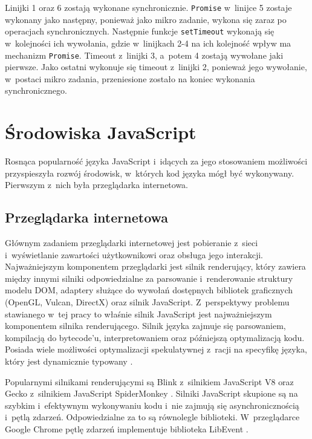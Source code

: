 Linijki 1 oraz 6 zostają wykonane synchronicznie. \lstinline{Promise} w~linijce 5 zostaje wykonany jako następny, ponieważ jako mikro zadanie, wykona się zaraz po operacjach synchronicznych. Następnie funkcje \lstinline{setTimeout} wykonają się w~kolejności ich wywołania, gdzie w~linijkach 2-4 na ich kolejność wpływ ma mechanizm \lstinline{Promise}. Timeout z~linijki 3, a~potem 4 zostają wywołane jaki pierwsze. Jako ostatni wykonuje się timeout z~linijki 2, ponieważ jego wywołanie, w~postaci mikro zadania, przeniesione zostało na koniec wykonania synchronicznego.

\section{Środowiska JavaScript}
\label{sec:env-modules}

Rosnąca popularność języka JavaScript i~idących za jego stosowaniem możliwości przyspieszyła rozwój środowisk, w~których kod języka mógł być wykonywany. Pierwszym z~nich była przeglądarka internetowa. 

\subsection{Przeglądarka internetowa}

Głównym zadaniem przeglądarki internetowej jest pobieranie z~sieci i~wyświetlanie zawartości użytkownikowi oraz obsługa jego interakcji. Najważniejszym komponentem przeglądarki jest silnik renderujący, który zawiera między innymi silniki odpowiedzialne za parsowanie i~renderowanie struktury modelu DOM, adaptery służące do wywołań dostępnych bibliotek graficznych (OpenGL, Vulcan, DirectX) oraz silnik JavaScript. Z~perspektywy problemu stawianego w~tej pracy to właśnie silnik JavaScript jest najważniejszym komponentem silnika renderującego. Silnik języka zajmuje się parsowaniem, kompilacją do bytecode'u, interpretowaniem oraz późniejszą optymalizacją kodu. Posiada wiele możliwości optymalizacji spekulatywnej z~racji na specyfikę języka, który jest dynamicznie typowany \cite{meurer_2017}.

Popularnymi silnikami renderującymi są Blink z~silnikiem JavaScript V8 \cite{V8} oraz Gecko z~silnikiem JavaScript SpiderMonkey \cite{spidermonkey}. Silniki JavaScript skupione są na szybkim i~efektywnym wykonywaniu kodu i~nie zajmują się asynchronicznością i~pętlą zdarzeń. Odpowiedzialne za to są równolegle biblioteki. W~przeglądarce Google Chrome pętlę zdarzeń implementuje biblioteka LibEvent \cite{libevent}.

